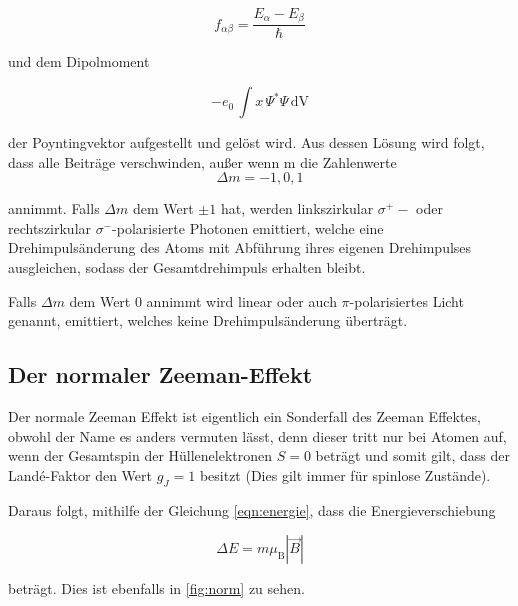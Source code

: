 \begin{equation}
    f_{\alpha\beta}= \frac{E_{\alpha} - E_{\beta}}{\hbar}
    \label{eqn:f}
  \end{equation}

\noindent
und dem Dipolmoment 

  \begin{equation}
    -e_0\, \int x \, \Psi^* \Psi \, \text{dV}
  \end{equation}

der Poyntingvektor aufgestellt und gelöst wird. Aus dessen Lösung wird folgt, dass alle Beiträge verschwinden, außer wenn m die Zahlenwerte
\begin{equation}
  \Delta m = -1,0,1
\end{equation}

\noindent
annimmt. Falls $\Delta m $ dem Wert $ \pm 1$ hat,  werden linkszirkular $\sigma^{+}-$ oder rechtszirkular $\sigma^{-}$-polarisierte
Photonen emittiert, welche eine Drehimpulsänderung des Atoms mit Abführung ihres eigenen Drehimpulses ausgleichen,
sodass der Gesamtdrehimpuls erhalten bleibt. 

\noindent
Falls $\Delta m $ dem Wert $0$ annimmt wird linear oder auch $\pi$-polarisiertes Licht genannt, emittiert,
welches keine Drehimpulsänderung überträgt.
 
\subsection{Der normaler Zeeman-Effekt}
Der normale Zeeman Effekt ist eigentlich ein Sonderfall des Zeeman Effektes, obwohl der Name es anders vermuten lässt, denn dieser tritt nur bei Atomen auf, wenn der 
Gesamtspin der Hüllenelektronen $S = 0$ beträgt und somit  gilt, dass der Landé-Faktor den Wert $g_J = 1$ besitzt (Dies gilt immer für spinlose Zustände).

\noindent
Daraus folgt, mithilfe der Gleichung \ref{eqn:energie}, dass die Energieverschiebung 

\begin{equation}
    \Delta E = m \mu_\text{B} |\vec{B}| 
\end{equation}

\noindent
beträgt. Dies ist ebenfalls in \autoref{fig:norm} zu sehen.

